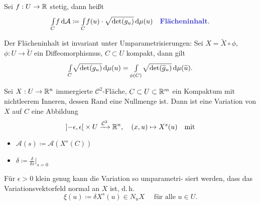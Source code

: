 \documentclass{cheat-sheet}
\newcommand{\A}{\mathcal{A}}
\begin{document}
\begin{defn}
  Sei $f : U \to \mathbb{R}$ stetig, dann heißt
  \[ \Int{C}{}{f}{\A} \coloneqq \Int{C}{}{f(u) \cdot \sqrt{\det(g_u)}}{\mu (u)} \quad \text{\emph{Flächeninhalt}.} \]
\end{defn}

\begin{prop}
  Der Flächeninhalt ist invariant unter Umparametrisierungen: Sei $X = \widetilde{X} \circ \phi$, $\phi : U \to \widetilde{U}$ ein Diffeomorphismus, $C \subset U$ kompakt, dann gilt
  \[ {\textstyle \int\limits_{C}^{}} \sqrt{\det(g_u)} \,\mathrm{d} \mu (u) = {\textstyle \int\limits_{\phi(C)}^{}} \sqrt{\det(\widetilde{g}_u)} \,\mathrm{d} \mu (\widetilde{u}). \]
\end{prop}



\begin{defn}
  Sei $X : U \to \mathbb{R}^n$ immergierte $\mathcal{C}^2$-Fläche,
  $C \subset U \subset \mathbb{R}^m$ ein Kompaktum mit nichtleerem Inneren, dessen Rand eine Nullmenge ist.
  Dann ist eine Variation von $X$ auf $C$ eine Abbildung
  \[
    \left] -\epsilon, \epsilon \right[ \times U \xrightarrow{\mathcal{C}^2} \mathbb{R}^n, \quad
    (x, u) \mapsto X^s(u) \quad \text{mit}
  \]
  \begin{itemize}
  \end{itemize}
\end{defn}

\begin{nota}
  \begin{multicols}{2}
    \begin{itemize}
      \item $\A(s) \coloneqq \A(X^s(C))$
      \item $\delta \coloneqq \tfrac{\delta}{\delta s}|_{s = 0}$
    \end{itemize}
  \end{multicols}
\end{nota}

\begin{lem}
  Für $\epsilon > 0$ klein genug kann die Variation so umparametri- siert werden, dass das Variationsvektorfeld normal an $X$ ist, d.\,h.
  \[ \xi(u) \coloneqq \delta X^s(u) \in N_u X \quad \text{ für alle } u \in U. \]
\end{lem}
\end{document}
